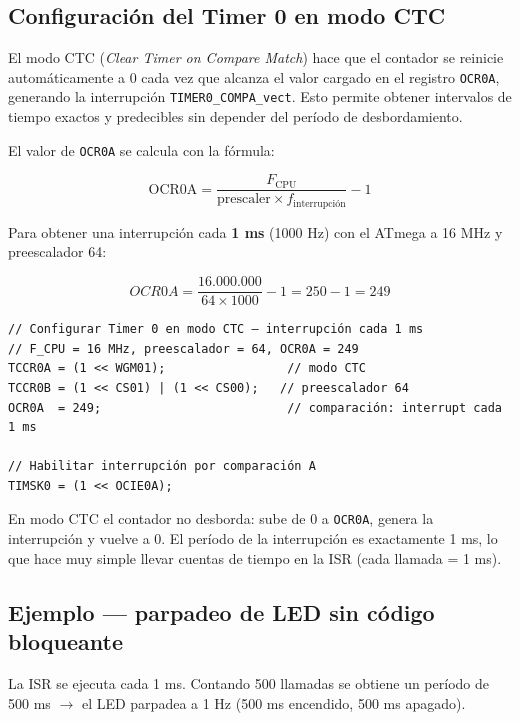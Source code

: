 \subsection{Configuración del Timer 0 en modo CTC}

El modo CTC (\textit{Clear Timer on Compare Match}) hace que el contador se reinicie
automáticamente a 0 cada vez que alcanza el valor cargado en el registro
\texttt{OCR0A}, generando la interrupción \texttt{TIMER0\_COMPA\_vect}. Esto permite
obtener intervalos de tiempo exactos y predecibles sin depender del período de
desbordamiento.

El valor de \texttt{OCR0A} se calcula con la fórmula:

$$\text{OCR0A} = \frac{F_{\text{CPU}}}{\text{prescaler} \times f_{\text{interrupción}}} - 1$$

Para obtener una interrupción cada \textbf{1 ms} (1000 Hz) con el ATmega a 16 MHz y
preescalador 64:

$$OCR0A = \frac{16.000.000}{64 \times 1000} - 1 = 250 - 1 = 249$$

\begin{lstlisting}[style=estilo-c]
// Configurar Timer 0 en modo CTC — interrupción cada 1 ms
// F_CPU = 16 MHz, preescalador = 64, OCR0A = 249
TCCR0A = (1 << WGM01);                 // modo CTC
TCCR0B = (1 << CS01) | (1 << CS00);   // preescalador 64
OCR0A  = 249;                          // comparación: interrupt cada 1 ms

// Habilitar interrupción por comparación A
TIMSK0 = (1 << OCIE0A);
\end{lstlisting}

En modo CTC el contador no desborda: sube de 0 a \texttt{OCR0A}, genera la
interrupción y vuelve a 0. El período de la interrupción es exactamente 1 ms, lo
que hace muy simple llevar cuentas de tiempo en la ISR (cada llamada = 1 ms).

\subsection{Ejemplo --- parpadeo de LED sin código bloqueante}

La ISR se ejecuta cada 1 ms. Contando 500 llamadas se obtiene un período de 500 ms
$\rightarrow$ el LED parpadea a 1 Hz (500 ms encendido, 500 ms apagado).

